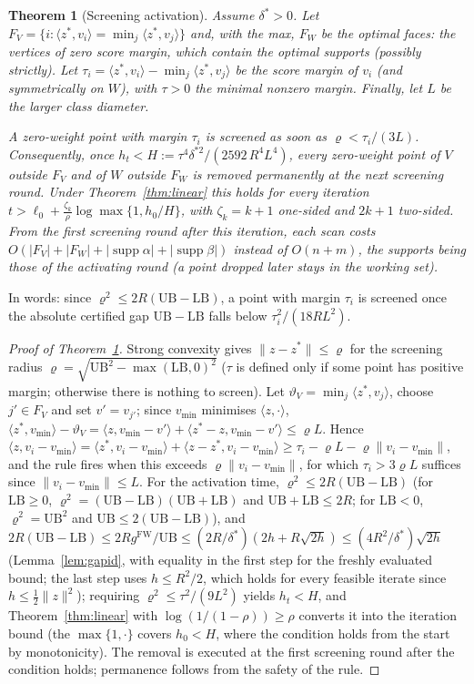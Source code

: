 \documentclass[pdflatex,sn-apa]{sn-jnl}%
\newtheorem{theorem}{Theorem}
\theoremstyle{thmstyleone}
\newtheorem{theorem}{Theorem}
\theoremstyle{thmstyletwo}
\newcommand{\ip}[2]{\langle #1, #2 \rangle}
\newcommand{\norm}[1]{\lVert #1 \rVert}
\newcommand{\gFW}{g^{\mathrm{FW}}}
\newcommand{\UB}{\mathrm{UB}}
\newcommand{\LB}{\mathrm{LB}}
\begin{document}
\begin{theorem}[Screening activation]\label{thm:activation}
Assume $\delta^*>0$. Let $F_V=\{i:\ip{z^*}{v_i}=\min_j\ip{z^*}{v_j}\}$
and, with the max, $F_W$ be the optimal faces: the vertices of zero
score margin, which contain the optimal supports (possibly strictly). Let
$\tau_i=\ip{z^*}{v_i}-\min_j\ip{z^*}{v_j}$ be the score margin of $v_i$
(and symmetrically on $W$), with $\tau>0$ the minimal nonzero margin.
Finally, let $L$ be the larger class diameter.

A zero-weight point with margin $\tau_i$ is screened as soon as
$\varrho<\tau_i/(3L)$. Consequently, once
$h_t<H:=\tau^4\delta^{*2}/(2592\,R^4L^4)$, every zero-weight point of
$V$ outside $F_V$ and of $W$ outside $F_W$ is removed permanently at
the next screening round. Under Theorem~\ref{thm:linear} this holds for
every iteration $t>\ell_0+\tfrac{\zeta_k}{\rho}\log\max\{1,h_0/H\}$, with
$\zeta_k=k+1$ one-sided and $2k+1$ two-sided.
From the first screening round after this iteration, each scan costs
$O(|F_V|+|F_W|+|\operatorname{supp}\alpha|+|\operatorname{supp}\beta|)$
instead of $O(n+m)$, the supports being those of the activating round
(a point dropped later stays in the working set).
\end{theorem}
In words: since $\varrho^2\le2R(\UB-\LB)$, a point with margin $\tau_i$ is
screened once the absolute certified gap $\UB-\LB$ falls below $\tau_i^2/(18RL^2)$. 
\begin{proof}[Proof of Theorem~\ref{thm:activation}]
Strong convexity gives $\norm{z-z^*}\le\varrho$ for the screening radius
$\varrho=\sqrt{\UB^2-\max(\LB,0)^2}$ ($\tau$ is defined only if some point
has positive margin; otherwise there is nothing to screen). Let
$\vartheta_V=\min_j\ip{z^*}{v_j}$, choose $j'\in F_V$ and set $v'=v_{j'}$; since $v_{\min}$ minimises $\ip{z}{\cdot}$,
$\ip{z^*}{v_{\min}}-\vartheta_V=\ip{z}{v_{\min}-v'}+\ip{z^*-z}{v_{\min}-v'}\le\varrho L$.
Hence $\ip{z}{v_i-v_{\min}}=\ip{z^*}{v_i-v_{\min}}+\ip{z-z^*}{v_i-v_{\min}}\ge\tau_i-\varrho L-\varrho\norm{v_i-v_{\min}}$,
and the rule fires when this exceeds $\varrho\norm{v_i-v_{\min}}$, for which
$\tau_i>3\varrho L$ suffices since $\norm{v_i-v_{\min}}\le L$. For the
activation time, $\varrho^2\le2R(\UB-\LB)$ (for $\LB\ge0$,
$\varrho^2=(\UB-\LB)(\UB+\LB)$ and $\UB+\LB\le2R$; for $\LB<0$, $\varrho^2=\UB^2$
and $\UB\le2(\UB-\LB)$), and
$2R(\UB-\LB)\le2R\gFW/\UB\le(2R/\delta^*)(2h+R\sqrt{2h})\le(4R^2/\delta^*)\sqrt{2h}$
(Lemma~\ref{lem:gapid}, with equality in the first step for the freshly
evaluated bound; the last step uses $h\le R^2/2$, which holds for every
feasible iterate since $h\le\tfrac12\norm z^2$); requiring
$\varrho^2\le\tau^2/(9L^2)$ yields $h_t<H$, and Theorem~\ref{thm:linear} with
$\log(1/(1-\rho))\ge\rho$ converts it into the iteration bound (the
$\max\{1,\cdot\}$ covers $h_0<H$, where the condition holds from the
start by monotonicity). The removal is executed at the first screening
round after the condition holds; permanence follows from the safety of
the rule.
\end{proof}
\end{document}
